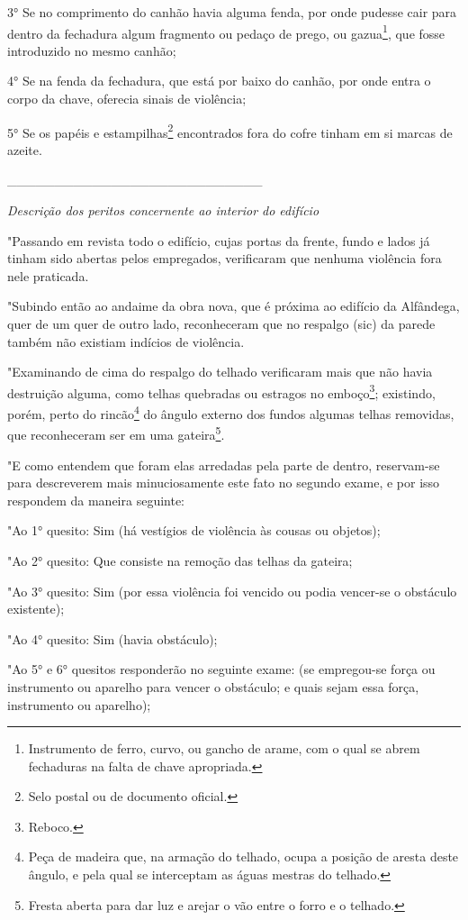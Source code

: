 3° Se no comprimento do canhão havia alguma fenda, por onde pudesse cair
para dentro da fechadura algum fragmento ou pedaço de prego, ou
gazua\footnote{Instrumento de ferro, curvo, ou gancho de arame, com o
  qual se abrem fechaduras na falta de chave apropriada.}, que fosse
introduzido no mesmo canhão;

4° Se na fenda da fechadura, que está por baixo do canhão, por onde
entra o corpo da chave, oferecia sinais de violência;

5° Se os papéis e estampilhas\footnote{Selo postal ou de documento
  oficial.} encontrados fora do cofre tinham em si marcas de azeite.

\_\_\_\_\_\_\_\_\_\_\_\_\_\_\_\_\_\_\_\_\_\_\_\_\_\_\_

\emph{Descrição dos peritos concernente ao interior do edifício}

"Passando em revista todo o edifício, cujas portas da frente, fundo e
lados já tinham sido abertas pelos empregados, verificaram que nenhuma
violência fora nele praticada.

"Subindo então ao andaime da obra nova, que é próxima ao edifício da
Alfândega, quer de um quer de outro lado, reconheceram que no respalgo
(sic) da parede também não existiam indícios de violência.

"Examinando de cima do respalgo do telhado verificaram mais que não
havia destruição alguma, como telhas quebradas ou estragos no
emboço\footnote{Reboco.}; existindo, porém, perto do rincão\footnote{Peça
  de madeira que, na armação do telhado, ocupa a posição de aresta deste
  ângulo, e pela qual se interceptam as águas mestras do telhado.} do
ângulo externo dos fundos algumas telhas removidas, que reconheceram ser
em uma gateira\footnote{Fresta aberta para dar luz e arejar o vão entre
  o forro e o telhado.}.

"E como entendem que foram elas arredadas pela parte de dentro,
reservam-se para descreverem mais minuciosamente este fato no segundo
exame, e por isso respondem da maneira seguinte:

"Ao 1° quesito: Sim (há vestígios de violência às cousas ou objetos);

"Ao 2° quesito: Que consiste na remoção das telhas da gateira;

"Ao 3° quesito: Sim (por essa violência foi vencido ou podia vencer-se o
obstáculo existente);

"Ao 4° quesito: Sim (havia obstáculo);

"Ao 5° e 6° quesitos responderão no seguinte exame: (se empregou-se
força ou instrumento ou aparelho para vencer o obstáculo; e quais sejam
essa força, instrumento ou aparelho);

